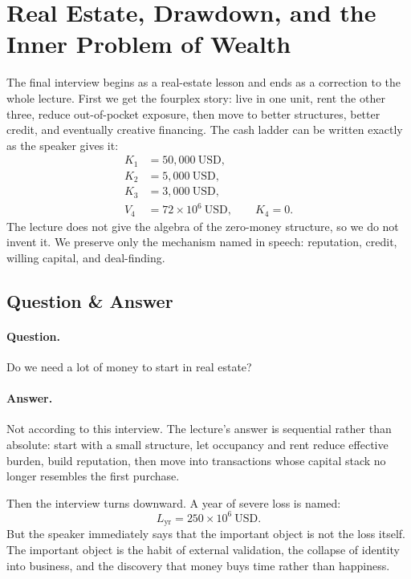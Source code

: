 \section{Real Estate, Drawdown, and the Inner Problem of Wealth}

The final interview begins as a real-estate lesson and ends as a correction to the whole lecture. First we get the fourplex story: live in one unit, rent the other three, reduce out-of-pocket exposure, then move to better structures, better credit, and eventually creative financing. The cash ladder can be written exactly as the speaker gives it:
\begin{align}
K_1 &= 50{,}000\ \mathrm{USD},\\
K_2 &= 5{,}000\ \mathrm{USD},\\
K_3 &= 3{,}000\ \mathrm{USD},\\
V_4 &= 72\times 10^{6}\ \mathrm{USD},\qquad K_4=0.
\end{align}
The lecture does not give the algebra of the zero-money structure, so we do not invent it. We preserve only the mechanism named in speech: reputation, credit, willing capital, and deal-finding.

\subsection{Question \& Answer}

\paragraph{Question.} Do we need a lot of money to start in real estate?

\paragraph{Answer.} Not according to this interview. The lecture's answer is sequential rather than absolute: start with a small structure, let occupancy and rent reduce effective burden, build reputation, then move into transactions whose capital stack no longer resembles the first purchase.

Then the interview turns downward. A year of severe loss is named:
\begin{equation}
L_{\mathrm{yr}}=250\times 10^{6}\ \mathrm{USD}.
\end{equation}
But the speaker immediately says that the important object is not the loss itself. The important object is the habit of external validation, the collapse of identity into business, and the discovery that money buys time rather than happiness.

